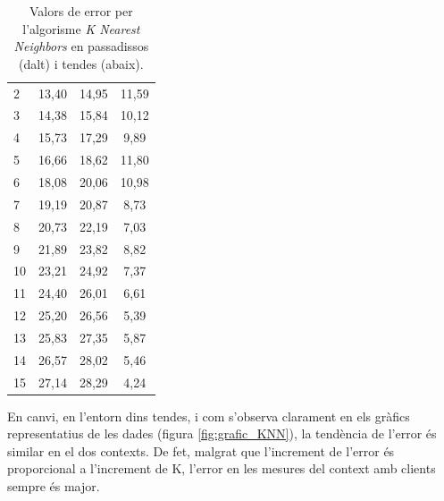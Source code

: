 \begin{table}[h]
\begin{center}
\begin{tabular}{|l|c|c|c|}
        2  & 13,40 & 14,95 & 11,59\\%
        3  & 14,38 & 15,84 & 10,12\\%
        4  & 15,73 & 17,29 & 9,89\\%
        5  & 16,66 & 18,62 & 11,80\\%
        6  & 18,08 & 20,06 & 10,98\\%
        7  & 19,19 & 20,87 & 8,73\\%
        8  & 20,73 & 22,19 & 7,03\\%
        9  & 21,89 & 23,82 & 8,82\\%
        10 & 23,21 & 24,92 & 7,37\\%
        11 & 24,40 & 26,01 & 6,61\\%
        12 & 25,20 & 26,56 & 5,39\\%
        13 & 25,83 & 27,35 & 5,87\\%
        14 & 26,57 & 28,02 & 5,46\\%
        15 & 27,14 & 28,29 & 4,24\\%

      \end{tabular}
      
   \end{center}
\caption{Valors de error per l'algorisme \textit{K Nearest Neighbors} en passadissos (dalt) i tendes (abaix).}
\label{tab:error_KNN}
  \end{table}

En canvi, en l'entorn dins tendes, i com s'observa clarament en els gràfics representatius de les dades (figura \ref{fig:grafic_KNN}), la tendència de l'error és similar en el dos contexts. De fet, malgrat que l'increment de l'error és proporcional a l'increment de K, l'error en les mesures del context amb clients sempre és major. 


